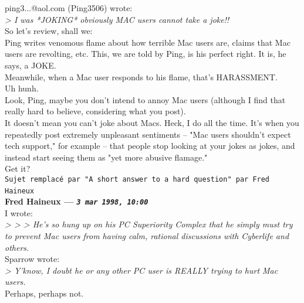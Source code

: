 \documentclass[11pt,twoside,a4paper]{article}
\begin{document}
\begin{multicols*}{2}
ping3...@aol.com (Ping3506) wrote:~\\
\emph{> I was *JOKING* obviously MAC users cannot take a joke!!}~\\

So let's review, shall we:~\\

Ping writes venomous flame about how terrible Mac users are, claims that Mac users are revolting, etc. This, we are told by Ping, is his perfect right. It is, he says, a JOKE.~\\

Meanwhile, when a Mac user responds to his flame, that's HARASSMENT.~\\

Uh hunh.~\\

Look, Ping, maybe you don't intend to annoy Mac users (although I find that really hard to believe, considering what you post).~\\

It doesn't mean you can't joke about Macs. Heck, I do all the time. It's when you repeatedly post extremely unpleasant sentiments -- "Mac users shouldn't expect tech support," for example -- that people stop looking at your jokes as jokes, and instead start seeing them as "yet more abusive flamage."~\\

Get it?~\\

 
		
	
		
\texttt{Sujet remplac{\'e} par "A short answer to a hard question" par Fred Haineux}~\\
		
	
		
\textbf{Fred Haineux --- \emph{\texttt{3 mar 1998, 10:00}}}~\\

I wrote:~\\
\emph{> > > He's so hung up on his PC Superiority Complex that he simply must try to prevent Mac users from having calm, rational discussions with Cyberlife and others.}~\\

Sparrow wrote:~\\
\emph{> Y'know, I doubt he or any other PC user is REALLY trying to hurt Mac users.}~\\

Perhaps, perhaps not.~\\


\end{multicols*}
\end{document}
